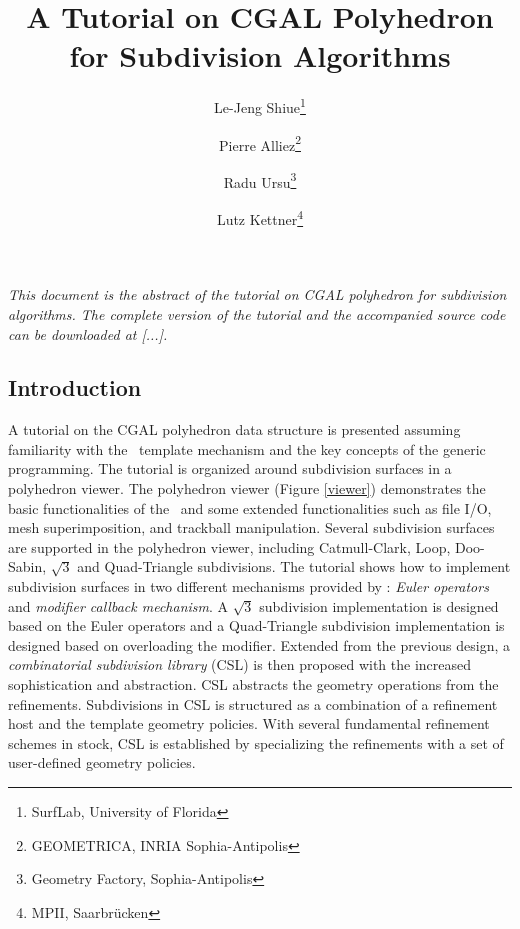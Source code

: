 \documentclass[letter,twocolumn]{article}
\begin{document}
\date{}
\title{{\LARGE {\sffamily\bfseries A Tutorial on CGAL Polyhedron \\
                                   for Subdivision Algorithms}}}


\author{\small
\sffamily Le-Jeng Shiue\footnote{SurfLab, University of Florida}
\and \small
\sffamily Pierre Alliez\footnote{GEOMETRICA, INRIA Sophia-Antipolis}
\and \small
\sffamily Radu Ursu\footnote{Geometry Factory, Sophia-Antipolis}
\and \small
\sffamily Lutz Kettner\footnote{MPII, Saarbr\"ucken}}
\maketitle

\thispagestyle{empty}

{\it
{\scriptsize
This document is the abstract of the tutorial on CGAL
polyhedron for subdivision algorithms. The complete 
version of the tutorial and the accompanied source code 
can be downloaded at [...].
}}

\subsection*{Introduction}

A tutorial on the CGAL polyhedron data structure
is presented assuming familiarity with the \CC\ 
template mechanism and the key concepts of the generic 
programming. The tutorial is organized around
subdivision surfaces in a polyhedron viewer.
The polyhedron viewer (Figure \ref{viewer}) demonstrates the
basic functionalities of the \cgalpoly\ and some extended
functionalities such as file I/O, mesh superimposition, and trackball
manipulation. Several subdivision surfaces are supported
in the polyhedron viewer, including Catmull-Clark, Loop, 
Doo-Sabin, $\sqrt{3}$ and Quad-Triangle subdivisions. 
The tutorial shows how to implement subdivision
surfaces in two different mechanisms provided by \cgalpoly :
\emph{Euler operators} and \emph{modifier callback mechanism}. 
A $\sqrt{3}$ subdivision implementation is designed based on the
Euler operators and a Quad-Triangle subdivision implementation
is designed based on overloading the modifier.  
Extended from the previous design, a 
\emph{combinatorial subdivision library} (CSL) is
then proposed with the increased sophistication and 
abstraction. CSL abstracts the geometry operations from 
the refinements. Subdivisions in CSL is structured as a 
combination of a refinement host and the template geometry 
policies. With several fundamental refinement schemes in stock,
CSL is established by specializing the refinements with a set of 
user-defined geometry policies.
\end{document}

